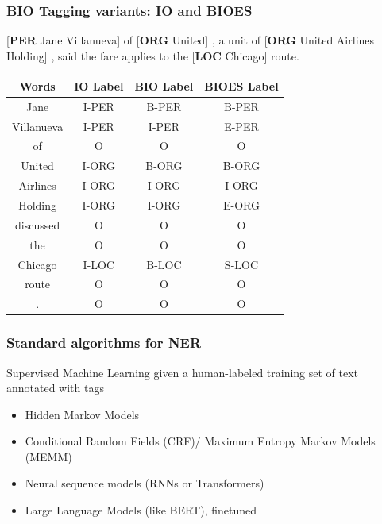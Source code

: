 \documentclass[13.5pt,aspecratio=169]{beamer}
\begin{document}
    \begin{frame}
    \onehalfspacing
    
        \frametitle{BIO Tagging variants: IO and BIOES}	
        \color{blue}[\textbf{PER} Jane Villanueva] \color{black}of \color{blue}[\textbf{ORG} United]\color{black} , a unit of \color{blue}[\textbf{ORG} United Airlines Holding]\color{black} , said the fare applies to the \color{blue}[\textbf{LOC} Chicago]\color{black} route. 
    \begin{center}
    \renewcommand{\arraystretch}{0.83} %
        \begin{tabular}{ |c|c|c|c| } 
        \hline
        \large Words &  \large IO Label & \large BIO Label & \large BIOES Label \\
        \hline \small
        Jane & \small I-PER &\small  B-PER &\small  B-PER \\  \small
        Villanueva & \small I-PER &\small  I-PER &\textbf{} E-PER \\  \small
        of & \small O &\small  O &\small  O\\  \small
        United & \small I-ORG &\small  B-ORG &\small  B-ORG \\  \small
        Airlines & \small I-ORG & I\small -ORG &\small  I-ORG \\  \small
        Holding & \small I-ORG &\small  I-ORG &\small  E-ORG \\  \small
        discussed & \small O &\small  O &\small  O\\  \small
        the & \small O &\small  O &\small  O\\  \small
        Chicago & \small I-LOC &\small  B-LOC &\small  S-LOC \\  \small
        route & \small O &\small  O &\small  O\\  \small
        . & \small O & \small O & \small O \\
    \hline
    \end{tabular}
    \end{center}
    \end{frame}
    \begin{frame}
    \onehalfspacing
    
        \frametitle{Standard algorithms for NER}	
        \begin{block}{}
         \large   Supervised Machine Learning given a human-labeled training set of text annotated with tags
        \begin{itemize}
            \item Hidden Markov Models
            \item Conditional Random Fields (CRF)/ Maximum Entropy Markov Models (MEMM)
            \item Neural sequence models (RNNs or Transformers)
            \item Large Language Models (like BERT), finetuned
        \end{itemize}
        \end{block}
    \end{frame}
    
\end{document}
